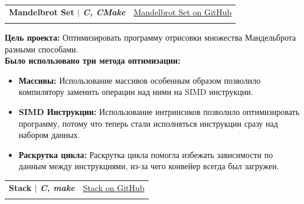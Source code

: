 \documentclass[A4,11pt]{article}
\makeatletter
\newcommand{\CVSubheading}[4]{
  \vspace{-2pt}\item
    \begin{tabular*}{0.97\textwidth}[t]{l@{\extracolsep{\fill}}r}
      \textbf{#1} & #2 \\
      \small#3 & \small #4 \\
    \end{tabular*}\vspace{-7pt}
}
\makeatother
\begin{document}
    \CVSubheading
      {{Mandelbrot Set} $|$ \emph{\small{C, CMake}}}{\href{https://github.com/Dinichthys/Mandelbrot}{Mandelbrot Set on GitHub}}{}{}
      \small{
      \textbf{Цель проекта:} Оптимизировать программу отрисовки множества Мандельброта разными способами. \\
\textbf{Было использовано три метода оптимизации:}
\begin{itemize}[nosep]
    \item \textbf{Массивы:} Использование массивов особенным образом позволило компилятору заменить операции над ними на SIMD инструкции.
    \item \textbf{SIMD Инструкции:} Использование интринсиков позволило оптимизировать программу, потому что теперь стали исполняться инструкции сразу над набором данных.
    \item \textbf{Раскрутка цикла:} Раскрутка цикла помогла избежать зависимости по данным между инструкциями, из-за чего
    конвейер всегда был загружен.
\end{itemize}
      }
      \CVSubheading
      {{Stack} $|$ \emph{\small{C, make}}}{\href{https://github.com/Dinichthys/Stack}{Stack on GitHub}}{}{}
\end{document}
